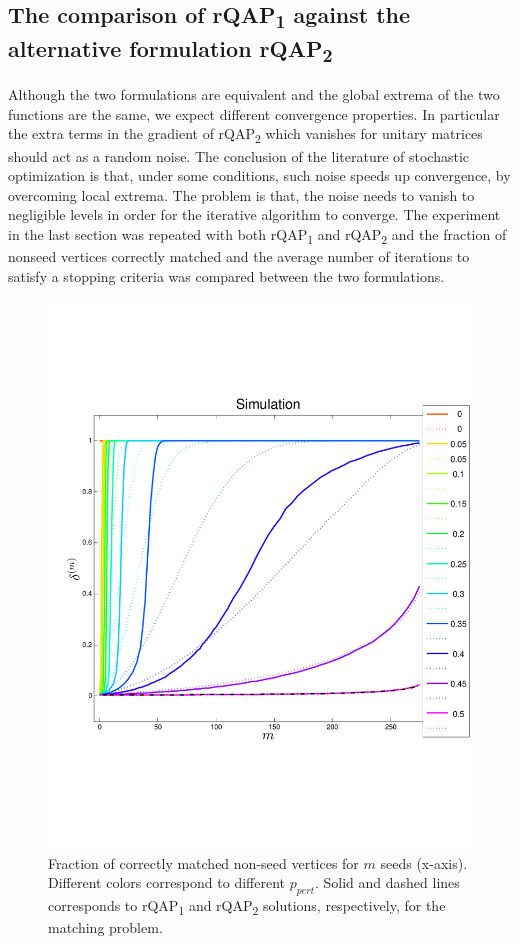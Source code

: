 \documentclass[12pt,oneside,final]{thesis}\usepackage[]{graphicx}\usepackage[]{color}
\begin{document}
\subsection{The comparison of rQAP\textsubscript{1} against the alternative formulation rQAP\textsubscript{2}}
Although the two formulations are equivalent and the global extrema of the two functions are the same, we expect different convergence  properties. In particular the extra terms in the gradient of rQAP\textsubscript{2} which vanishes for unitary matrices should act as a random noise. The conclusion of the literature of stochastic optimization  is that, under some conditions, such noise speeds up convergence, by overcoming local extrema. The problem is that, the noise needs to vanish to negligible levels in order for the iterative algorithm to converge. 
The experiment in the last  section was repeated with both rQAP\textsubscript{1} and rQAP\textsubscript{2} and the fraction of nonseed vertices correctly matched and the average number of iterations to satisfy a stopping criteria was compared between the two formulations. 


\begin{figure}
 \centering
  \caption{ Fraction of correctly matched non-seed vertices for $m$ seeds (x-axis). Different colors correspond to different  $p_{pert}$. Solid and dashed lines corresponds to rQAP\textsubscript{1} and rQAP\textsubscript{2} solutions, respectively, for the matching problem.
 \label{rqap2}}
 \includegraphics[width=1.2\textwidth]{sim_bitflip_rqap2_300_hsv.pdf}
\end{figure}
\end{document}
